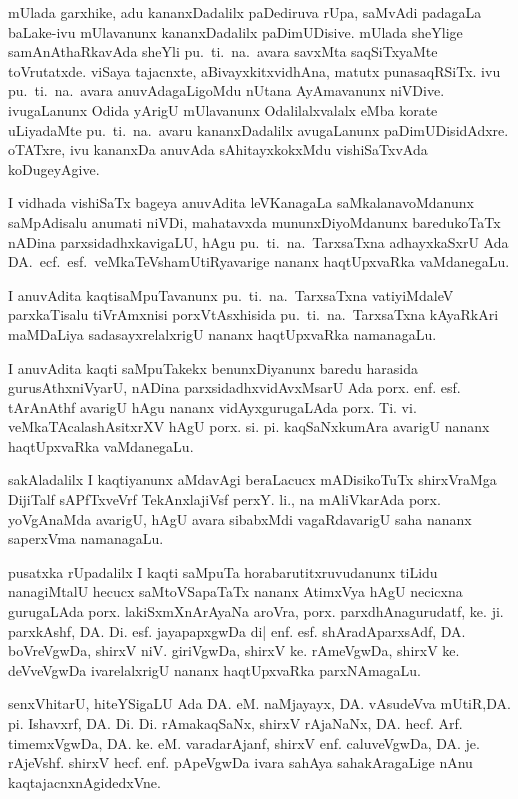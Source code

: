 mUlada garxhike, adu kananxDadalilx paDediruva rUpa, saMvAdi padagaLa baLake-ivu mUlavanunx kananxDadalilx paDimUDisive. mUlada sheYlige samAnAthaRkavAda sheYli pu.~ti.~na.~avara savxMta saqSiTxyaMte toVrutatxde. viSaya tajacnxte, aBivayxkitxvidhAna, matutx punasaqRSiTx. ivu pu.~ti.~na.~avara anuvAdagaLigoMdu nUtana AyAmavanunx niVDive. ivugaLanunx Odida yArigU mUlavanunx Odalilalxvalalx eMba korate uLiyadaMte pu.~ti.~na.~avaru kananxDadalilx avugaLanunx paDimUDisidAdxre. oTATxre, ivu kananxDa anuvAda sAhitayxkokxMdu vishiSaTxvAda koDugeyAgive.

\vfill\eject

I vidhada vishiSaTx bageya anuvAdita leVKanagaLa saMkalanavoMdanunx saMpAdi\-salu anumati niVDi, mahatavxda mununxDiyoMdanunx baredukoTaTx nADina parxsidadhx\-kavi\-gaLU, hAgu pu.~ti.~na.~TarxsaTxna adhayxkaSxrU Ada DA.~ecf.~esf.~veMkaTeVshamUtiR\-yavarige nananx haqtUpxvaRka vaMdanegaLu.

I anuvAdita kaqtisaMpuTavanunx pu.~ti.~na.~TarxsaTxna vatiyiMdaleV parxkaTisalu tiVrAmxnisi porxVtAsxhisida pu.~ti.~na.~TarxsaTxna kAyaRkAri maMDaLiya sadasayxrelalxrigU nananx haqtUpxvaRka namanagaLu. 

I anuvAdita kaqti saMpuTakekx benunxDiyanunx baredu  harasida gurusAthxniVyarU, nADina parxsidadhxvidAvxMsarU Ada porx. enf. esf. tArAnAthf avarigU hAgu nananx vidAyxgurugaLAda porx. Ti. vi. veMkaTAcalashAsitxrXV hAgU porx. si. pi. kaqSaNxkumAra avarigU nananx haqtUpxvaRka vaMdanegaLu.

sakAladalilx I kaqtiyanunx aMdavAgi beraLacucx mADisikoTuTx shirxVraMga DijiTalf sAPfTxveVrf TekAnxlajiVsf perxY. li., na mAliVkarAda porx. yoVgAnaMda avarigU, hAgU avara sibabxMdi vagaRdavarigU saha nananx saperxVma namanagaLu.

pusatxka rUpadalilx I kaqti saMpuTa horabarutitxruvudanunx tiLidu nanagiMtalU hecucx saMtoVSapaTaTx nananx AtimxVya hAgU necicxna gurugaLAda porx. lakiSxmXnArAyaNa aroVra, porx. parxdhAnagurudatf, ke. ji. parxkAshf, DA. Di. esf. jayapapxgwDa di| enf. esf. shAradAparxsAdf, DA. boVreVgwDa, shirxV niV. giriVgwDa, shirxV ke. rAmeVgwDa, shirxV ke. deVveVgwDa ivarelalxrigU nananx haqtUpxvaRka parxNAmagaLu. 

senxVhitarU, hiteYSigaLU Ada DA. eM. naMjayayx, DA. vAsudeVva mUtiR,\break DA. pi. Ishavxrf, DA. Di. Di. rAmakaqSaNx, shirxV rAjaNaNx, DA. hecf. Arf. timemxVgwDa, DA. ke. eM. varadarAjanf, shirxV enf. caluveVgwDa, DA. je. rAjeVshf. shirxV hecf. enf. pApeVgwDa ivara sahAya sahakAragaLige nAnu kaqtajacnxnAgidedxVne.

